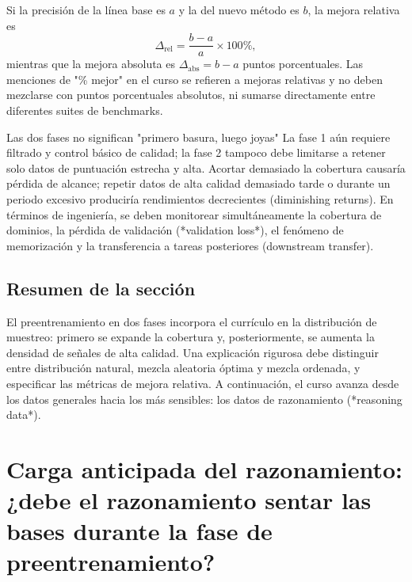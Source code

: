\documentclass[a4paper]{article}
\begin{document}
Si la precisión de la línea base es $a$ y la del nuevo método es $b$, la mejora relativa es
\[
\Delta_{\mathrm{rel}}=\frac{b-a}{a}\times 100\%,
\]
mientras que la mejora absoluta es $\Delta_{\mathrm{abs}}=b-a$ puntos porcentuales. Las menciones de "\% mejor" en el curso se refieren a mejoras relativas y no deben mezclarse con puntos porcentuales absolutos, ni sumarse directamente entre diferentes suites de benchmarks.


\begin{warningbox}{Las dos fases no significan "primero basura, luego joyas"}
La fase 1 aún requiere filtrado y control básico de calidad; la fase 2 tampoco debe limitarse a retener solo datos de puntuación estrecha y alta. Acortar demasiado la cobertura causaría pérdida de alcance; repetir datos de alta calidad demasiado tarde o durante un periodo excesivo produciría rendimientos decrecientes (diminishing returns). En términos de ingeniería, se deben monitorear simultáneamente la cobertura de dominios, la pérdida de validación (*validation loss*), el fenómeno de memorización y la transferencia a tareas posteriores (downstream transfer).
\end{warningbox}

\subsection{Resumen de la sección}

El preentrenamiento en dos fases incorpora el currículo en la distribución de muestreo: primero se expande la cobertura y, posteriormente, se aumenta la densidad de señales de alta calidad. Una explicación rigurosa debe distinguir entre distribución natural, mezcla aleatoria óptima y mezcla ordenada, y especificar las métricas de mejora relativa. A continuación, el curso avanza desde los datos generales hacia los más sensibles: los datos de razonamiento (*reasoning data*).
\section{Carga anticipada del razonamiento: ¿debe el razonamiento sentar las bases durante la fase de preentrenamiento?}
\end{document}

